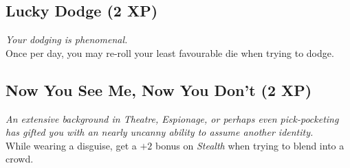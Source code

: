 \subsection*{Lucky Dodge (2 XP)}
\textit{Your dodging is phenomenal.}\\
Once per day, you may re-roll your least favourable die when trying to dodge.

\subsection*{Now You See Me, Now You Don't (2 XP)}
\textit{An extensive background in Theatre, Espionage, or perhaps even pick-pocketing has gifted you with an nearly uncanny ability to assume another identity.}\\
While wearing a disguise, get a $+2$ bonus on \textit{Stealth} when trying to blend into a crowd.
